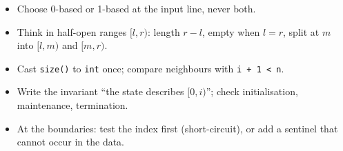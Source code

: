 \begin{checklistbox}
\begin{itemize}[leftmargin=*]
    \item[$\square$] Choose 0-based or 1-based at the input line, never both.
    \item[$\square$] Think in half-open ranges $[l, r)$: length $r - l$, empty when $l = r$, split at $m$ into $[l, m)$ and $[m, r)$.
    \item[$\square$] Cast \texttt{size()} to \texttt{int} once; compare neighbours with \texttt{i + 1 < n}.
    \item[$\square$] Write the invariant ``the state describes $[0, i)$''; check initialisation, maintenance, termination.
    \item[$\square$] At the boundaries: test the index first (short-circuit), or add a sentinel that cannot occur in the data.
\end{itemize}
\end{checklistbox}
